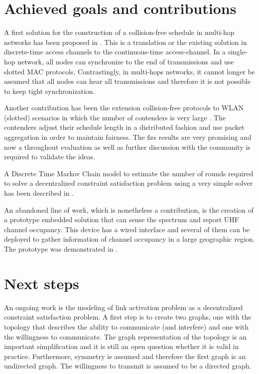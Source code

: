 \documentclass[a4paper,twocolumns]{article}%
\begin{document}
\section{Achieved goals and contributions}

A first solution for the construction of a collision-free schedule in multi-hop networks has been proposed in \cite{}.
This is a translation or the existing solution in discrete-time access channels to the continuous-time access-channel.
In a single-hop network, all nodes can synchronize to the end of transmissions and use slotted MAC protocols.
Contrastingly, in multi-hops networks, it cannot longer be assumed that all nodes can hear all transmissions and therefore it is not possible to keep tight synchronization.


Another contribution has been the extension collision-free protocols to WLAN (slotted) scenarios in which the number of contenders is very large \cite{}.
The contenders adjust their schedule length in a distributed fashion and use packet aggregation in order to maintain fairness.
The firs results are very promising \cite{} and now a throughout evaluation as well as further discussion with the community is required to validate the ideas.

A Discrete Time Markov Chain model to estimate the number of rounds required to solve a decentralized constraint satisfaction problem using a very simple solver has been described in \cite{}.

An abandoned line of work, which is nonetheless a contribution, is the creation of a prototype embedded solution that can sense the spectrum and report UHF channel occupancy.
This device has a wired interface and several of them can be deployed to gather information of channel occupancy in a large geographic region.
The prototype was demonstrated in \cite{}.


\section{Next steps}


An ongoing work is the modeling of link activation problem as a decentralized constraint satisfaction problem.
A first step is to create two graphs, one with the topology that describes the ability to communicate (and interfere) and one with the willingness to communicate.
The graph representation of the topology is an important simplification and it is still an open question whether it is valid in practice.
Furthermore, symmetry is assumed and therefore the first graph is an undirected graph.
The willingness to transmit is assumed to be a directed graph.
\end{document}
